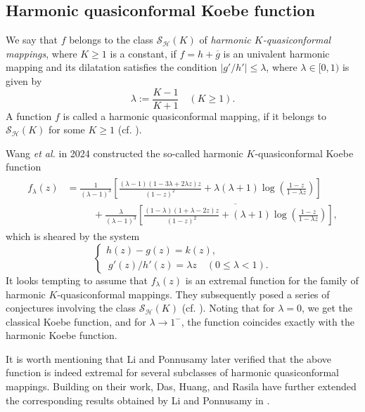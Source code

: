 \documentclass[11pt, reqno]{amsart}
\numberwithin{equation}{section}
\newcommand{\abs}[1]{\left\vert#1\right\vert}
\begin{document}
\subsection{Harmonic quasiconformal Koebe function}


We say that $f$ belongs to the class $\mathcal{S}_\mathcal{H}(K)$ of \textit{harmonic $K$-quasiconformal mappings}, where $K\ge 1$ is a constant, if $f=h+\overline{g}$ is an univalent harmonic mapping and its dilatation satisfies the condition 
$\abs{{g'}/{h'}}\leq \lambda$, where $\lambda\in [0,1)$ is given by
$$
\lambda:=\frac{K-1}{K+1}\quad(K\geq 1).
$$ A function $f$ is called a harmonic quasiconformal mapping, if it belongs to $\mathcal{S}_\mathcal{H}(K)$ for some $K\ge 1$ (cf. \cite{lz,wang1}).

Wang \textit{et al.} \cite{wwrq} in 2024 constructed the so-called harmonic $K$-quasiconformal Koebe function \begin{align*}\begin{split}\label{31}
  f_\lambda(z)&=\frac{1}{(\lambda-1)^3}{\left[\frac{(\lambda-1)(1-3\lambda+2\lambda z)z }{(1-z)^2}+\lambda(\lambda+1) \log\left(\frac{1-z}{1-\lambda z}\right)\right]}\\ & \qquad\ \ \ +\frac{\lambda}{(\lambda-1)^3}\overline{{\left[\frac{(1-\lambda)(1+\lambda-2z)z}{(1-z)^2}+(\lambda+1) \log\left(\frac{1-z}{1-\lambda z}\right)\right]} },\end{split}
\end{align*}
 which is sheared by the system
\begin{equation*}
    \begin{cases}
       h(z)-g(z)=k(z),\\
\ g'(z)/h'(z)=\lambda z\quad(0\leq \lambda<1).
    \end{cases}
\end{equation*}
It looks tempting to assume that $f_\lambda(z)$ is an extremal function for the family of harmonic $K$-quasiconformal mappings. They subsequently posed a series of conjectures involving the class $\mathcal{S}_\mathcal{H}(K)$ (cf. \cite{wwrq}).
Noting that for $\lambda=0$, we get the classical Koebe function, and for $\lambda\rightarrow1^-$, the function coincides exactly with the harmonic Koebe function.

It is worth mentioning that Li and Ponnusamy \cite{lp} later verified that the above function is indeed extremal for several subclasses of harmonic quasiconformal mappings. Building on their work, Das, Huang, and Rasila \cite{dhr} have further extended the corresponding results obtained by Li and Ponnusamy in \cite{lp}.
\end{document}
